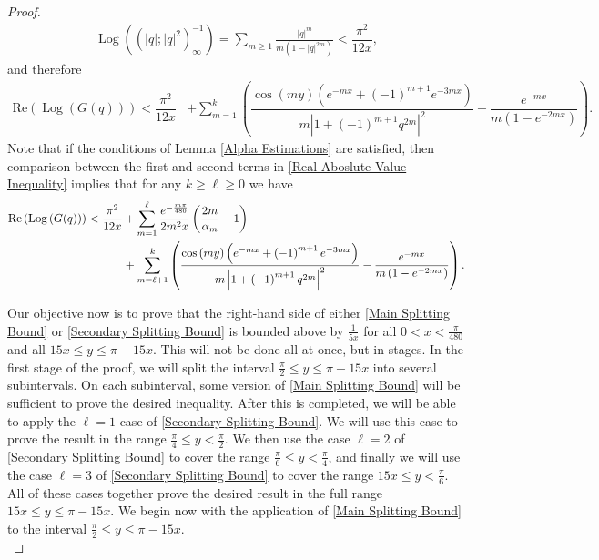 \documentclass[11pt,reqno]{amsart}
\theoremstyle{definition}
\theoremstyle{plain}
\theoremstyle{named}
\DeclareMathOperator\Log{Log}
\numberwithin{equation}{section}
\theoremstyle{example}
\def\lp{\left(}
\def\rp{\right)}
\begin{document}
\begin{proof}
\begin{align*}
    \Log\lp \lp |q|; |q|^2 \rp_\infty^{-1} \rp = \sum_{m \geq 1} \frac{|q|^m}{m\lp 1 - |q|^{2m} \rp} < \dfrac{\pi^2}{12x},
\end{align*}
and therefore
\begin{align} \label{Main Splitting Bound}
    \mathrm{Re}\lp \Log\lp G(q) \rp \rp < \dfrac{\pi^2}{12x} &+ \sum_{m=1}^k \lp \dfrac{\cos\lp my \rp \lp e^{-mx} + \lp -1 \rp^{m+1} e^{-3mx} \rp}{m \left| 1 + \lp -1 \rp^{m+1} q^{2m} \right|^2} - \dfrac{e^{-mx}}{m\lp 1 - e^{-2mx} \rp} \rp.
\end{align}
Note that if the conditions of Lemma \ref{Alpha Estimations} are satisfied, then comparison between the first and second terms in \eqref{Real-Aboslute Value Inequality} implies that for any $k \geq \ell \geq 0$ we have
\begin{align} \label{Secondary Splitting Bound}
	\mathrm{Re}\lp \Log\lp G(q) \rp \rp < \dfrac{\pi^2}{12x} &+ \sum_{m=1}^\ell \dfrac{e^{- \frac{m\pi}{480}}}{2m^2 x} \lp \dfrac{2m}{\alpha_m} - 1 \rp \notag \\ &+ \sum_{m=\ell+1}^k \lp \dfrac{\cos\lp my \rp \lp e^{-mx} + \lp -1 \rp^{m+1} e^{-3mx} \rp}{m \left| 1 + \lp -1 \rp^{m+1} q^{2m} \right|^2} - \dfrac{e^{-mx}}{m\lp 1 - e^{-2mx} \rp} \rp.
\end{align}

Our objective now is to prove that the right-hand side of either \eqref{Main Splitting Bound} or \eqref{Secondary Splitting Bound} is bounded above by $\frac{1}{5x}$ for all $0 < x < \frac{\pi}{480}$ and all $15x \leq y \leq \pi - 15x$. This will not be done all at once, but in stages. In the first stage of the proof, we will split the interval $\frac{\pi}{2} \leq y \leq \pi - 15x$ into several subintervals. On each subinterval, some version of \eqref{Main Splitting Bound} will be sufficient to prove the desired inequality. After this is completed, we will be able to apply the $\ell = 1$ case of \eqref{Secondary Splitting Bound}. We will use this case to prove the result in the range $\frac{\pi}{4} \leq y < \frac{\pi}{2}$. We then use the case $\ell = 2$ of \eqref{Secondary Splitting Bound} to cover the range $\frac{\pi}{6} \leq y < \frac{\pi}{4}$, and finally we will use the case $\ell = 3$ of \eqref{Secondary Splitting Bound} to cover the range $15x \leq y < \frac{\pi}{6}$. All of these cases together prove the desired result in the full range $15x \leq y \leq \pi - 15x$. We begin now with the application of \eqref{Main Splitting Bound} to the interval $\frac{\pi}{2} \leq y \leq \pi - 15x$. \\


\end{proof}
\end{document}
